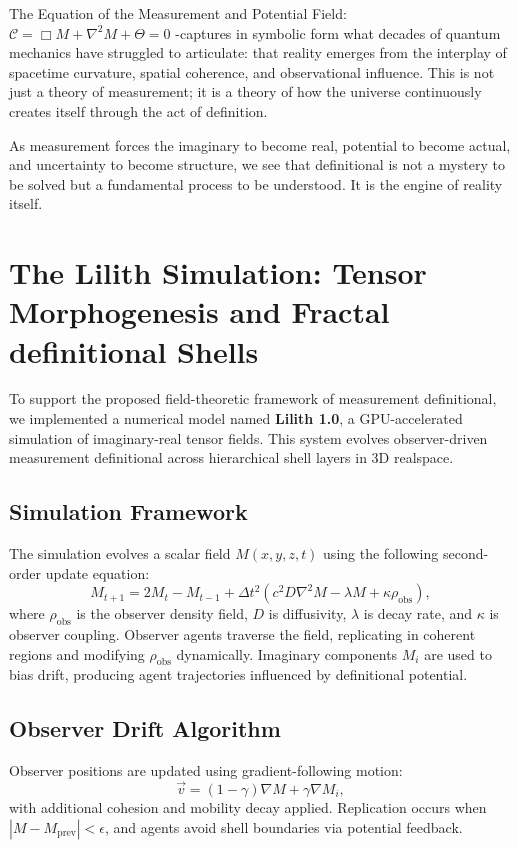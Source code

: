 The Equation of the Measurement and Potential Field: $\mathcal{C} = \Box M + \nabla^2 M + \Theta = 0$ -captures in symbolic form what decades of quantum mechanics have struggled to articulate: that reality emerges from the interplay of spacetime curvature, spatial coherence, and observational influence. This is not just a theory of measurement; it is a theory of how the universe continuously creates itself through the act of definition.

As measurement forces the imaginary to become real, potential to become actual, and uncertainty to become structure, we see that definitional is not a mystery to be solved but a fundamental process to be understood. It is the engine of reality itself.

\section{The Lilith Simulation: Tensor Morphogenesis and Fractal definitional Shells}

To support the proposed field-theoretic framework of measurement definitional, we implemented a numerical model named \textbf{Lilith 1.0}, a GPU-accelerated simulation of imaginary-real tensor fields. This system evolves observer-driven measurement definitional across hierarchical shell layers in 3D realspace.

\subsection{Simulation Framework}

The simulation evolves a scalar field $M(x, y, z, t)$ using the following second-order update equation:
\begin{equation}
M_{t+1} = 2M_t - M_{t-1} + \Delta t^2 \left( c^2 D \nabla^2 M - \lambda M + \kappa \rho_{\text{obs}} \right),
\end{equation}
where $\rho_{\text{obs}}$ is the observer density field, $D$ is diffusivity, $\lambda$ is decay rate, and $\kappa$ is observer coupling. Observer agents traverse the field, replicating in coherent regions and modifying $\rho_{\text{obs}}$ dynamically. Imaginary components $M_i$ are used to bias drift, producing agent trajectories influenced by definitional potential.

\subsection{Observer Drift Algorithm}
Observer positions are updated using gradient-following motion:
\begin{equation}
\vec{v} = (1 - \gamma) \nabla M + \gamma \nabla M_i,
\end{equation}
with additional cohesion and mobility decay applied. Replication occurs when $|M - M_{\text{prev}}| < \epsilon$, and agents avoid shell boundaries via potential feedback.


